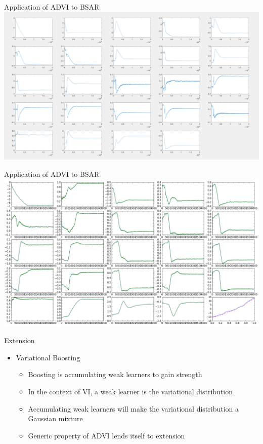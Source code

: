 \documentclass[color=usernames,dvipsnames]{beamer}
\begin{document}
\begin{frame}{Application of ADVI to BSAR}
  \includegraphics[scale=0.23]{param_evol.png}
\end{frame}
\begin{frame}{Application of ADVI to BSAR}
\includegraphics[scale=0.26]{basis_20.png}
\end{frame}
\begin{frame}{Extension}
  \begin{itemize}
    \item<+-> Variational Boosting
    \begin{itemize}
      \item<+-> Boosting is accumulating weak learners to gain strength
      \item<+-> In the context of VI, a weak learner is the variational distribution
      \item<+-> Accumulating weak learners will make the variational distribution a Gaussian mixture
      \item<+-> Generic property of ADVI lends itself to extension
    \end{itemize}
  \end{itemize}
\end{frame}
\end{document}
